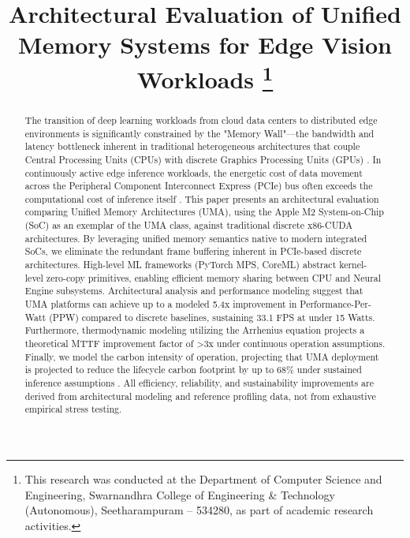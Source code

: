 \documentclass[conference]{IEEEtran}
\begin{document}
\title{Architectural Evaluation of Unified Memory Systems for Edge Vision Workloads
\thanks{This research was conducted at the Department of Computer Science and Engineering, Swarnandhra College of Engineering \& Technology (Autonomous), Seetharampuram – 534280, as part of academic research activities.}
}

\author{
}

\maketitle

\begin{abstract}
The transition of deep learning workloads from cloud data centers to distributed edge environments is significantly constrained by the "Memory Wall"—the bandwidth and latency bottleneck inherent in traditional heterogeneous architectures that couple Central Processing Units (CPUs) with discrete Graphics Processing Units (GPUs) \cite{b2}. In continuously active edge inference workloads, the energetic cost of data movement across the Peripheral Component Interconnect Express (PCIe) bus often exceeds the computational cost of inference itself \cite{b8}. This paper presents an architectural evaluation comparing Unified Memory Architectures (UMA), using the Apple M2 System-on-Chip (SoC) as an exemplar of the UMA class, against traditional discrete x86-CUDA architectures. By leveraging unified memory semantics native to modern integrated SoCs, we eliminate the redundant frame buffering inherent in PCIe-based discrete architectures. High-level ML frameworks (PyTorch MPS, CoreML) abstract kernel-level zero-copy primitives, enabling efficient memory sharing between CPU and Neural Engine subsystems. Architectural analysis and performance modeling suggest that UMA platforms can achieve up to a modeled 5.4x improvement in Performance-Per-Watt (PPW) compared to discrete baselines, sustaining 33.1 FPS at under 15 Watts. Furthermore, thermodynamic modeling utilizing the Arrhenius equation projects a theoretical MTTF improvement factor of >3x under continuous operation assumptions. Finally, we model the carbon intensity of operation, projecting that UMA deployment is projected to reduce the lifecycle carbon footprint by up to 68\% under sustained inference assumptions \cite{b12}. All efficiency, reliability, and sustainability improvements are derived from architectural modeling and reference profiling data, not from exhaustive empirical stress testing.
\end{abstract}
\end{document}
